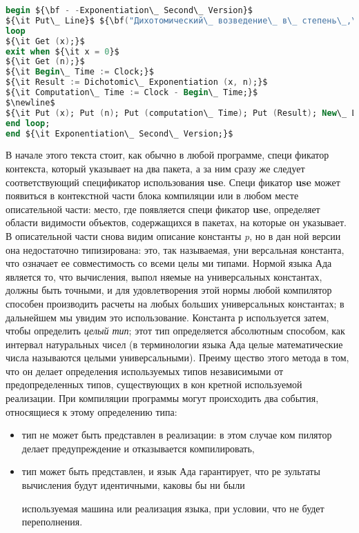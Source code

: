 \documentclass{mai_book}
\begin{document}
\newpage
\begin{lstlisting}[mathescape=true, language=Ada, basicstyle=\small]
begin ${\bf - -Exponentiation\_ Second\_ Version}$
${\it Put\_ Line}$ ${\bf("Дихотомический\_ возведение\_ в\_ степень\_,\_ вторая\_ версия");}$
loop
${\it Get (x);}$
exit when ${\it x = 0}$
${\it Get (n);}$
${\it Begin\_ Time := Clock;}$
${\it Result := Dichotomic\_ Exponentiation (x, n);}$
${\it Computation\_ Time := Clock - Begin\_ Time;}$
$\newline$
${\it Put (x); Put (n); Put (computation\_ Time); Put (Result); New\_ Line;}$
end loop;
end ${\it Exponentiation\_ Second\_ Version;}$
\end{lstlisting}
В начале этого текста стоит, как обычно в любой программе, специ­
фикатор контекста, который указывает на два пакета, а за ним сразу
же следует соответствующий спецификатор использования {\bf use}. Специ­
фикатор {\bf use} может появиться в контекстной части блока компиляции
или в любом месте описательной части: место, где появляется специ­
фикатор {\bf use}, определяет области видимости объектов, содержащихся
в пакетах, на которые он указывает.
В описательной части снова видим описание константы {\it p}, но в дан­
ной версии она недостаточно типизирована: это, так называемая, уни­
версальная константа, что означает ее совместимость со всеми целы­
ми типами. Нормой языка Ада является то, что вычисления, выпол­
няемые на универсальных константах, должны быть точными, и для
удовлетворения этой нормы любой компилятор способен производить
расчеты на любых больших универсальных константах; в дальнейшем
мы увидим это использование. Константа р используется затем, чтобы
определить {\it целый тип}; этот тип определяется абсолютным способом,
как интервал натуральных чисел (в терминологии языка Ада целые
математические числа называются целыми универсальными). Преиму­
щество этого метода в том, что он делает определения используемых
типов независимыми от предопределенных типов, существующих в кон­
кретной используемой реализации. При компиляции программы могут
происходить два события, относящиеся к этому определению типа:
\begin{itemize}
\item тип не может быть представлен в реализации: в этом случае ком­
пилятор делает предупреждение и отказывается компилировать,
\item тип может быть представлен, и язык Ада гарантирует, что ре­
зультаты вычисления будут идентичными, каковы бы ни были
\newpage

используемая машина или реализация языка, при условии, что не
будет переполнения.
\end{itemize}
\end{document}
